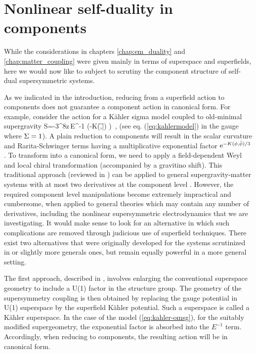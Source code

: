 \chapter{Nonlinear self-duality in components}
\label{chap:components}

While the considerations in chapters \ref{chap:em_duality} and \ref{chap:matter_coupling} were given mainly in terms of superspace and superfields, here we would now like to subject to scrutiny the component structure of self-dual supersymmetric systems.

As we indicated in the introduction, reducing from a superfield action to components does not guarantee a component action in canonical form. For example, consider the action for a K{\"a}hler sigma model coupled to old-minimal supergravity 
\be
\label{eq:kahler-omsg}
S=-3\int\!^8z\,E^{-1}
\exp\!\!\left(-K(\f,{\bar \f})
\right)~,
\ee
(see eq. (\ref{eq:kahlermodel}) in the gauge where $\S=1$). A plain reduction to components will result in the scalar curvature and Rarita-Schwinger terms having a multiplicative exponential factor ${\rm e}^{-K(\f,{\bar \f})/3}$. To transform into a canonical form, we need to apply a field-dependent Weyl and local chiral transformation (accompanied by a gravitino shift). This traditional approach (reviewed in \cite{Bagger:1990qh}) can be applied to general supergravity-matter systems with at most two derivatives at the component level \cite{Cremmer:1978iv,Cremmer:1978hn, Cremmer:1982wb,Cremmer:1982en}.
However, the required component level manipulations become extremely impractical and cumbersome, when applied to general theories which may contain any number of derivatives, including the nonlinear supersymmetric electrodynamics that we are investigating. It would make sense to look for an alternative in which such complications are removed through judicious use of superfield techniques. There exist two alternatives \cite{Kugo:1982mr,Binetruy:2000zx} that were originally developed for the systems scrutinized in \cite{Cremmer:1978iv,Cremmer:1978hn, Cremmer:1982wb,Cremmer:1982en} or slightly more generals ones, but remain equally powerful in a more general setting. 

The first approach, described in \cite{Binetruy:2000zx}, involves enlarging the conventional superspace geometry to include a U(1) factor in the structure group. The geometry of the supersymmetry coupling is then obtained by replacing the gauge potential in U(1) superspace by the superfield K{\"a}hler potential. Such a superspace is called a K{\"a}hler superspace. In the case of the model (\ref{eq:kahler-omsg}), for the suitably modified supergeometry, the exponential factor is absorbed into the $E^{-1}$ term. Accordingly, when reducing to components, the resulting action will be in canonical form.

